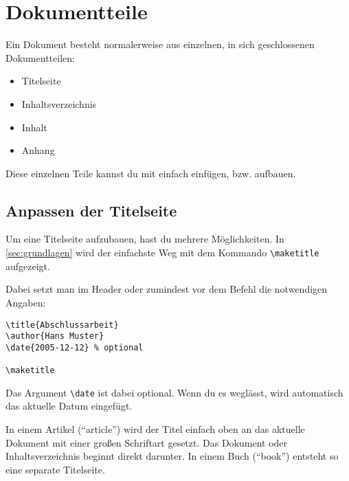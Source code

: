 %
%

\chapter{Dokumentteile}

Ein Dokument besteht normalerweise aus einzelnen, in sich geschlossenen Dokumentteilen:

\begin{itemize}
	\item Titelseite
	\item Inhaltsverzeichnis
	\item Inhalt
	\item Anhang
\end{itemize}

Diese einzelnen Teile kannst du mit \DMLLaTeX{} einfach einfügen, bzw. aufbauen.

\section{Anpassen der Titelseite}

Um eine Titelseite aufzubauen, hast du mehrere Möglichkeiten. In \cref{sec:grundlagen} wird der einfachste Weg mit dem Kommando \texttt{\textbackslash maketitle} aufgezeigt.

Dabei setzt man im Header oder zumindest vor dem Befehl die notwendigen Angaben:
\begin{lstlisting}
\title{Abschlussarbeit}
\author{Hans Muster}
\date{2005-12-12} % optional

\maketitle
\end{lstlisting}

Das Argument \texttt{\textbackslash date} ist dabei optional. Wenn du es weglässt, wird automatisch das aktuelle Datum eingefügt. 

In einem Artikel (\enquote{article}) wird der Titel einfach oben an das aktuelle Dokument mit einer großen Schriftart gesetzt. Das Dokument oder Inhaltsverzeichnis beginnt direkt darunter. In einem Buch (\enquote{book}) entsteht so eine separate Titelseite.

